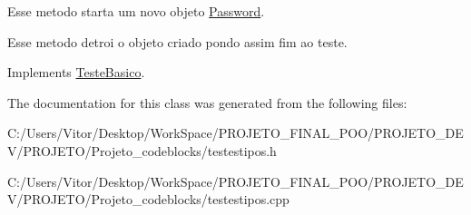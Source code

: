 Esse metodo starta um novo objeto \hyperlink{class_password}{Password}. 

Esse metodo detroi o objeto criado pondo assim fim ao teste. 

Implements \hyperlink{class_teste_basico_a9801730ac8a0acc39a901a179aa91e97}{Teste\-Basico}.



The documentation for this class was generated from the following files\-:\begin{DoxyCompactItemize}
\item 
C\-:/\-Users/\-Vitor/\-Desktop/\-Work\-Space/\-P\-R\-O\-J\-E\-T\-O\-\_\-\-F\-I\-N\-A\-L\-\_\-\-P\-O\-O/\-P\-R\-O\-J\-E\-T\-O\-\_\-\-D\-E\-V/\-P\-R\-O\-J\-E\-T\-O/\-Projeto\-\_\-codeblocks/testestipos.\-h\item 
C\-:/\-Users/\-Vitor/\-Desktop/\-Work\-Space/\-P\-R\-O\-J\-E\-T\-O\-\_\-\-F\-I\-N\-A\-L\-\_\-\-P\-O\-O/\-P\-R\-O\-J\-E\-T\-O\-\_\-\-D\-E\-V/\-P\-R\-O\-J\-E\-T\-O/\-Projeto\-\_\-codeblocks/testestipos.\-cpp\end{DoxyCompactItemize}
